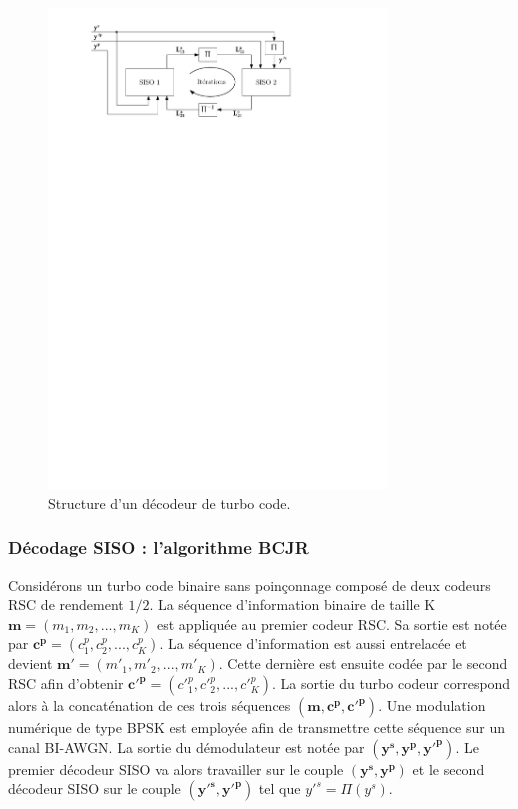 \begin{figure}[!h]
	\centering
	\includegraphics[width=9cm]{main/ch1_fig/TurboDec.pdf}
	\caption{\label{fig:turboDec} Structure d'un décodeur de turbo code.}
\end{figure}

%
	
	

\subsubsection{Décodage SISO : l'algorithme BCJR}\label{sec:BCJR}
Considérons un turbo code binaire sans poinçonnage composé de deux codeurs RSC de rendement $1/2$. La séquence d'information 
binaire de taille K $\mathbf{m} = (m_1, m_2, ..., m_K)$ est appliquée au premier codeur RSC. Sa sortie est notée par 
$\mathbf{c^p} = (c^p_1, c^p_2, ..., c^p_K)$. La séquence d'information est aussi entrelacée et devient 
$\mathbf{m'} = (m'_1, m'_2, ..., m'_K)$. Cette dernière est ensuite codée par le second RSC afin d'obtenir 
$\mathbf{c'^p} = (c'^p_1, c'^p_2, ..., c'^p_K)$. La sortie du turbo codeur correspond alors à la concaténation de ces trois 
séquences $(\mathbf{m}, \mathbf{c^p}, \mathbf{c'^p})$. Une modulation numérique de type BPSK est employée afin de 
transmettre cette séquence sur un canal BI-AWGN. La sortie du démodulateur est notée par $(\mathbf{y^s},\mathbf{y^p},\mathbf{y'^p})$. 
Le premier décodeur SISO va alors travailler sur le couple $(\mathbf{y^s},\mathbf{y^p})$ et le second décodeur SISO sur le 
couple $(\mathbf{y'^s},\mathbf{y'^p})$ tel que $y'^s = \Pi(y^s)$.

